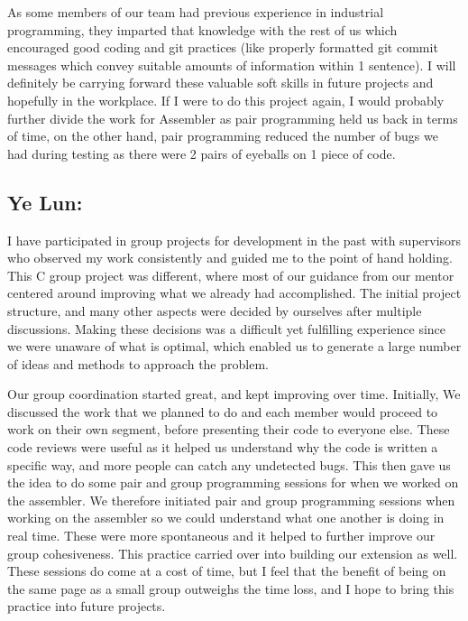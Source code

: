 \documentclass[a4paper]{article}
\begin{document}
As some members of our team had previous experience in industrial programming, they imparted that knowledge with the rest of us which encouraged good coding and git practices (like properly formatted git commit messages which convey suitable amounts of information within 1 sentence). I will definitely be carrying forward these valuable soft skills in future projects and hopefully in the workplace. If I were to do this project again, I would probably further divide the work for Assembler as pair programming held us back in terms of time, on the other hand, pair programming reduced the number of bugs we had during testing as there were 2 pairs of eyeballs on 1 piece of code.

\subsection{Ye Lun:}
I have participated in group projects for development in the past with supervisors who observed my work consistently and guided me to the point of hand holding. This C group project was different, where most of our guidance from our mentor centered around improving what we already had accomplished. The initial project structure, and many other aspects were decided by ourselves after multiple discussions. Making these decisions was a difficult yet fulfilling experience since we were unaware of what is optimal, which enabled us to generate a large number of ideas and methods to approach the problem.

Our group coordination started great, and kept improving over time. Initially, We discussed the work that we planned to do and each member would proceed to work on their own segment, before presenting their code to everyone else. These code reviews were useful as it helped us understand why the code is written a specific way, and more people can catch any undetected bugs. This then gave us the idea to do some pair and group programming sessions for when we worked on the assembler. We therefore initiated pair and group programming sessions when working on the assembler so we could understand what one another is doing in real time. These were more spontaneous and it helped to further improve our group cohesiveness. This practice carried over into building our extension as well. These sessions do come at a cost of time, but I feel that the benefit of being on the same page as a small group outweighs the time loss, and I hope to bring this practice into future projects.
\end{document}
